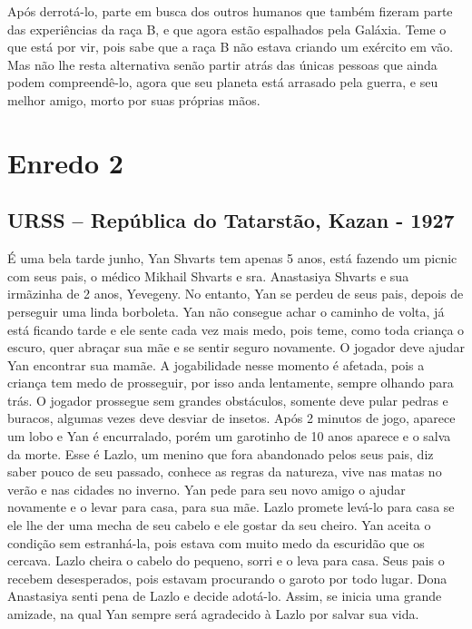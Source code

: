 \documentclass[12pt, a4paper]{article}
\begin{document}
    Após derrotá-lo, parte em busca dos outros humanos que também fizeram parte
    das experiências da raça B, e que agora estão espalhados pela Galáxia.
    Teme o que está por vir, pois sabe que a raça B não estava criando um exército
    em vão. Mas não lhe resta alternativa senão partir atrás das únicas pessoas que ainda
    podem compreendê-lo, agora que seu planeta está arrasado pela
    guerra, e seu melhor amigo, morto por suas próprias mãos.

\section{Enredo 2}
    \subsection{URSS – República do Tatarstão, Kazan - 1927}

	É uma bela tarde junho, Yan Shvarts tem apenas 5 anos, está fazendo
    um picnic com seus pais, o médico Mikhail Shvarts e sra. Anastasiya 
    Shvarts e sua irmãzinha de 2 anos, Yevegeny. No entanto, Yan se perdeu
    de seus pais, depois de perseguir uma linda borboleta. Yan não 
    consegue achar o caminho de volta, já está ficando tarde e ele sente 
    cada vez mais medo, pois teme, como toda criança o escuro, quer
    abraçar sua mãe e se sentir seguro novamente. 
	O jogador deve ajudar Yan encontrar sua mamãe. A jogabilidade nesse 
    momento é afetada, pois a criança tem medo de prosseguir, por isso 
    anda lentamente, sempre olhando para trás. O jogador prossegue sem 
    grandes obstáculos, somente deve pular pedras e buracos, algumas 
    vezes deve desviar de insetos. 
	Após 2 minutos de jogo, aparece um lobo e Yan é encurralado, porém
    um garotinho de 10 anos aparece e o salva da morte. Esse é Lazlo,
    um menino que fora abandonado pelos seus pais, diz saber pouco de
    seu passado, conhece as regras da natureza, vive nas matas no 
    verão e nas cidades no inverno.
	Yan pede para seu novo amigo o ajudar novamente e o levar para casa, 
    para sua mãe. Lazlo promete levá-lo para casa se ele lhe der uma 
    mecha de seu cabelo e ele gostar da seu cheiro. Yan aceita o condição 
    sem estranhá-la, pois estava com muito medo da escuridão que os 
    cercava. Lazlo cheira o cabelo do pequeno, sorri e o leva para casa.
	Seus pais o recebem desesperados, pois estavam procurando o garoto 
    por todo lugar. Dona Anastasiya senti pena de Lazlo e decide 
    adotá-lo. Assim, se inicia uma grande amizade, na qual Yan sempre 
    será agradecido à Lazlo por salvar sua vida.
\end{document}
